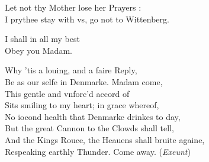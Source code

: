 \documentclass[a5paper,DIV=calc,11pt]{scrbook}
\begin{document}
\begin{drama*}
    \queenspeaks Let not thy Mother lose her Prayers \ham:\\
    I prythee stay with vs, go not to Wittenberg.
    
    \hamspeaks I shall in all my best\\
    Obey you Madam.
    
    \kingspeaks Why 'tis a louing, and a faire Reply,\\
    Be as our selfe in Denmarke. Madam come,\\
    This gentle and vnforc'd accord of \ham\\
    Sits smiling to my heart; in grace whereof,\\
    No iocond health that Denmarke drinkes to day,\\
    But the great Cannon to the Clowds shall tell,\\
    And the Kings Rouce, the Heauens shall bruite againe,\\
    Respeaking earthly Thunder. Come away. \hfill(\textit{Exeunt})
    
    

\end{drama*}
\end{document}
